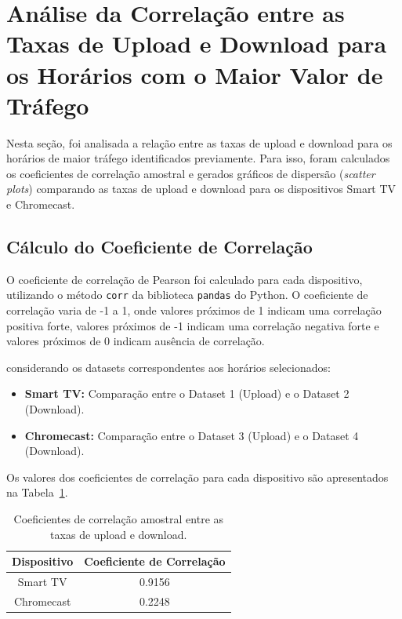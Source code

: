 \section{Análise da Correlação entre as Taxas de Upload e Download para os Horários com o Maior Valor de Tráfego}

Nesta seção, foi analisada a relação entre as taxas de upload e download para os horários de maior tráfego identificados previamente. Para isso, foram calculados os coeficientes de correlação amostral e gerados gráficos de dispersão (\textit{scatter plots}) comparando as taxas de upload e download para os dispositivos Smart TV e Chromecast.

\subsection{Cálculo do Coeficiente de Correlação}

O coeficiente de correlação de Pearson foi calculado para cada dispositivo, utilizando o método \texttt{corr} da biblioteca \texttt{pandas} do Python. O coeficiente de correlação varia de -1 a 1, onde valores próximos de 1 indicam uma correlação positiva forte, valores próximos de -1 indicam uma correlação negativa forte e valores próximos de 0 indicam ausência de correlação.

considerando os datasets correspondentes aos horários selecionados:
\begin{itemize}
    \item \textbf{Smart TV:} Comparação entre o Dataset 1 (Upload) e o Dataset 2 (Download).
    \item \textbf{Chromecast:} Comparação entre o Dataset 3 (Upload) e o Dataset 4 (Download).
\end{itemize}

Os valores dos coeficientes de correlação para cada dispositivo são apresentados na Tabela~\ref{tab:coeficientes_correlacao}.

\begin{table}[H]
    \centering
    \caption{Coeficientes de correlação amostral entre as taxas de upload e download.}
    \label{tab:coeficientes_correlacao}
    \begin{tabular}{|c|c|}
        \hline
        \textbf{Dispositivo} & \textbf{Coeficiente de Correlação} \\ \hline
        Smart TV & 0.9156 \\ \hline
        Chromecast & 0.2248 \\ \hline
    \end{tabular}
\end{table}

